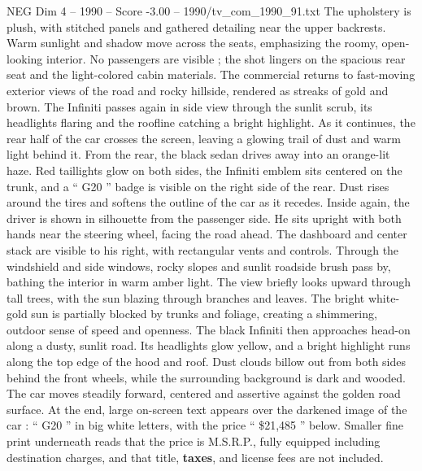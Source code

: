 \begin{textsample}{NEG Dim 4 – 1990 – Score -3.00 – 1990/tv\_com\_1990\_91.txt}
The upholstery is plush, with stitched panels and gathered detailing near the upper backrests.
Warm sunlight and shadow move across the seats, emphasizing the roomy, open-looking interior.
No passengers are visible ; the shot lingers on the spacious rear seat and the light-colored cabin materials.
The commercial returns to fast-moving exterior views of the road and rocky hillside, rendered as streaks of gold and brown.
The Infiniti passes again in side view through the sunlit scrub, its headlights flaring and the roofline catching a bright highlight.
As it continues, the rear half of the car crosses the screen, leaving a glowing trail of dust and warm light behind it.
From the rear, the black sedan drives away into an orange-lit haze.
Red taillights glow on both sides, the Infiniti emblem sits centered on the trunk, and a “ G20 ” badge is visible on the right side of the rear.
Dust rises around the tires and softens the outline of the car as it recedes.
Inside again, the driver is shown in silhouette from the passenger side.
He sits upright with both hands near the steering wheel, facing the road ahead.
The dashboard and center stack are visible to his right, with rectangular vents and controls.
Through the windshield and side windows, rocky slopes and sunlit roadside brush pass by, bathing the interior in warm amber light.
The view briefly looks upward through tall trees, with the sun blazing through branches and leaves.
The bright white-gold sun is partially blocked by trunks and foliage, creating a shimmering, outdoor sense of speed and openness.
The black Infiniti then approaches head-on along a dusty, sunlit road.
Its headlights glow yellow, and a bright highlight runs along the top edge of the hood and roof.
Dust clouds billow out from both sides behind the front wheels, while the surrounding background is dark and wooded.
The car moves steadily forward, centered and assertive against the golden road surface.
At the end, large on-screen text appears over the darkened image of the car : “ G20 ” in big white letters, with the price “ \$21,485 ” below.
Smaller fine print underneath reads that the price is M.S.R.P., fully equipped including destination charges, and that title, \textbf{taxes}, and license fees are not included.

\end{textsample}
